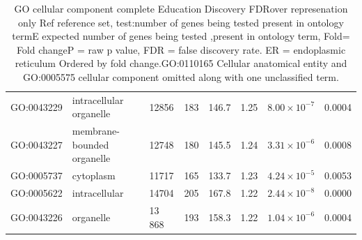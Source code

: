 \begin{table}[ht]
\begin{adjustbox}{width=\textwidth}
\begin{tabular}{llllllll}
  GO:0043229 & intracellular organelle  & 12856 & 183 & 146.7 & 1.25 & $8.00 \times 10^{-7}$ & 0.0004 \\ 
  GO:0043227 & membrane-bounded organelle  & 12748 & 180 & 145.5 & 1.24 & $3.31 \times 10^{-6}$ & 0.0008 \\ 
  GO:0005737 & cytoplasm  & 11717 & 165 & 133.7 & 1.23 & $4.24 \times 10^{-5}$ & 0.0053 \\ 
  GO:0005622 & intracellular  & 14704 & 205 & 167.8 & 1.22 & $2.44 \times 10^{-8}$ & 0.0000 \\ 
  GO:0043226 & organelle  & 13  868 & 193 & 158.3 & 1.22 & $1.04 \times 10^{-6}$ & 0.0004 \\ 
   \bottomrule
\end{tabular}
\end{adjustbox}
\caption[GO cellular component PANTHER Education Discovery]{GO cellular component complete Education Discovery FDRover represenation only  Ref reference set, test:number of genes being tested present in ontology termE expected number of genes being tested ,present in ontology term, Fold= Fold changeP = raw p value, FDR = false discovery rate. ER = endoplasmic reticulum Ordered by fold change.GO:0110165 Cellular anatomical entity and GO:0005575 cellular component omitted along with one unclassified term. } 
\label{tab:GO cellular component complete Education Discovery FDRover represenation only}
\end{table}
        
